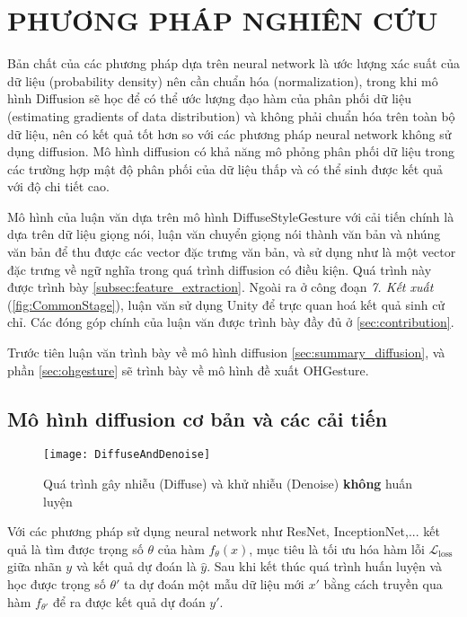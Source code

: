 \chapter{PHƯƠNG PHÁP NGHIÊN CỨU}
\label{chap:Chapter3}

Bản chất của các phương pháp dựa trên neural network là ước lượng xác suất của dữ liệu (probability density) nên cần chuẩn hóa (normalization), trong khi mô hình Diffusion sẽ học để có thể ước lượng đạo hàm của phân phối dữ liệu \cite{song2021score} (estimating gradients of data distribution) và không phải chuẩn hóa trên toàn bộ dữ liệu, nên có kết quả tốt hơn so với các phương pháp neural network không sử dụng diffusion. Mô hình diffusion có khả năng mô phỏng phân phối dữ liệu trong các trường hợp mật độ phân phối của dữ liệu thấp và có thể sinh được kết quả với độ chi tiết cao.

Mô hình của luận văn dựa trên mô hình DiffuseStyleGesture \cite{yang2022DiffuseStyleGestureplus} với cải tiến chính là dựa trên dữ liệu giọng nói, luận văn chuyển giọng nói thành văn bản và nhúng văn bản để thu được các vector đặc trưng văn bản, và sử dụng như là một vector đặc trưng về ngữ nghĩa trong quá trình diffusion có điều kiện. Quá trình này được trình bày \autoref{subsec:feature_extraction}. Ngoài ra ở công đoạn \textit{7. Kết xuất}  (\autoref{fig:CommonStage}), luận văn sử dụng Unity để trực quan hoá kết quả sinh cử chỉ.
Các đóng góp chính của luận văn được trình bày đầy đủ ở \autoref{sec:contribution}.

Trước tiên luận văn trình bày về mô hình diffusion \autoref{sec:summary_diffusion}, và phần \autoref{sec:ohgesture} sẽ trình bày về mô hình đề xuất OHGesture.

\section{Mô hình diffusion cơ bản và các cải tiến}
\label{sec:summary_diffusion}

\begin{figure}[H]
	\centering
	\texttt{[image: DiffuseAndDenoise]}
	\caption{Quá trình gây nhiễu (Diffuse) và khử nhiễu (Denoise) \textbf{không} huấn luyện}
	\label{fig:DiffuseAndDenoise}
\end{figure}

Với các phương pháp sử dụng neural network như ResNet, InceptionNet,... kết quả là tìm được trọng số $\theta$ của hàm $f_{\theta}(x)$, mục tiêu là tối ưu hóa hàm lỗi $\mathcal{L}_\text{loss}$ giữa nhãn $y$ và kết quả dự đoán là $\hat{y}$. Sau khi kết thúc quá trình huấn luyện và học được trọng số $\theta'$ ta dự đoán một mẫu dữ liệu mới $x'$ bằng cách truyền qua hàm $f_{\theta'}$ để ra được kết quả dự đoán $y'$.

